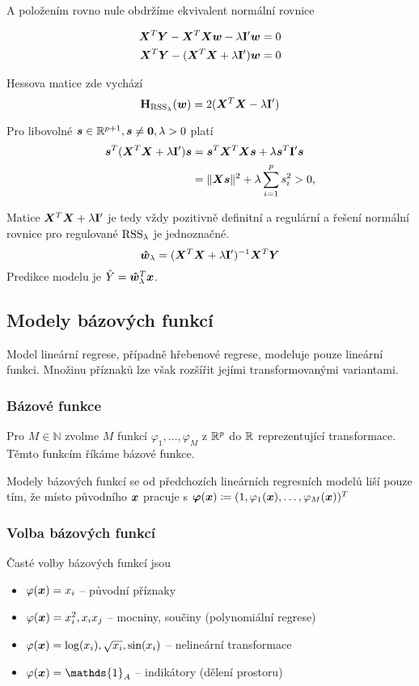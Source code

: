 A položením rovno nule obdržíme ekvivalent normální rovnice

\begin{align*}
    \bm{X}^T\bm{Y} - \bm{X}^T\bm{X}\bm{w} - \lambda \mathbf{I}' \bm{w} & = 0 \\
    \bm{X}^T\bm{Y} - (\bm{X}^T\bm{X} + \lambda \mathbf{I}') \bm{w}  & = 0
\end{align*}

Hessova matice zde vychází
\[
    \textbf{H}_{\operatorname{RSS}_\lambda}(\bm{w}) = 2(\bm{X}^T\bm{X} - \lambda \mathbf{I}')
\]

Pro libovolné $\bm{s} \in \mathbb{R}^{p+1}, \bm{s} \ne \bm{0}, \lambda > 0$ platí
\begin{align*}
    \bm{s}^T(\bm{X}^T\bm{X} + \lambda \mathbf{I}')\bm{s}
     & = \bm{s}^T \bm{X}^T\bm{X} \bm{s} + \lambda \bm{s}^T \mathbf{I}' \bm{s} \\
     & = \| \bm{X} \bm{s} \|^2 + \lambda \sum_{i=1}^{p} s_i^2 > 0,
\end{align*}

Matice $\bm{X}^T\bm{X} + \lambda \mathbf{I}'$ je tedy vždy pozitivně definitní a regulární a řešení normální rovnice pro regulované $\operatorname{RSS}_\lambda$ je jednoznačné.
\[\bm{\hat{w}}_\lambda = (\bm{X}^T\bm{X} + \lambda \mathbf{I}')^{-1} \bm{X}^T\bm{Y}\]
Predikce modelu je $\hat{Y} = \bm{\hat{w}}_\lambda^T\bm{x}$.

\subsection{Modely bázových funkcí}

Model lineární regrese, případně hřebenové regrese, modeluje pouze lineární funkci. Množinu příznaků lze však rozšířit jejími transformovanými variantami.

\subsubsection{Bázové funkce}

Pro $M \in \mathbb{N}$ zvolme $M$ funkcí $\varphi_1, \ldots, \varphi_M$ z $\mathbb{R}^{p}$ do $\mathbb{R}$ reprezentující transformace. Těmto funkcím říkáme bázové funkce.

Modely bázových funkcí se od předchozích lineárních regresních modelů liší pouze tím, že místo původního $\bm{x}$ pracuje s $\bm{\varphi}(\bm{x})  \coloneqq (1, \varphi_1(\bm{x}), \ldots, \varphi_M(\bm{x}))^T$

\subsubsection{Volba bázových funkcí}

Časté volby bázových funkcí jsou
\begin{itemize}
    \item $\varphi(\bm{x}) = x_i$ -- původní příznaky
    \item $\varphi(\bm{x}) = x_i^2, x_i x_j$ -- mocniny, součiny (polynomiální regrese)
    \item $\varphi(\bm{x}) = \log(x_i), \sqrt{x_i}, \sin(x_i)$ -- nelineární transformace
    \item $\varphi(\x) = \mathds{1}_{A}$ -- indikátory (dělení prostoru)
\end{itemize}

